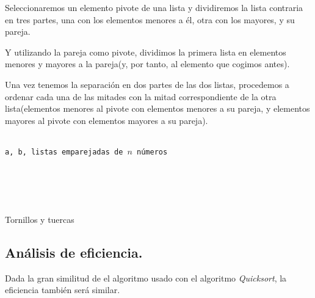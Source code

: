 \documentclass[a4paper, 11pt]{article} %
\begin{document}
    Seleccionaremos un elemento pivote de una lista y dividiremos la lista contraria en tres partes, una con los elementos menores a él, otra con los mayores, y su pareja.
    
    Y utilizando la pareja como pivote, dividimos la primera lista en elementos menores y mayores a la pareja(y, por tanto, al elemento que cogimos antes).
    
    Una vez tenemos la separación en dos partes de las dos listas, procedemos a ordenar cada una de las mitades con la mitad 
    correspondiente de la otra lista(elementos menores al pivote con elementos menores a su pareja, y elementos mayores al pivote con elementos mayores a su pareja).
\begin{algorithm}[H]
	\begin{algorithmic}[1]
	  \REQUIRE \ \\
	    \texttt{a, b, listas emparejadas de $n$ números}\\
	    \RETURN {\texttt{[]}}
	  \ELSE
	  \ENDIF \\
	  \ENDIF \\
	  
	  \ENDIF \\\
	\end{algorithmic}
    \caption{Tornillos y tuercas}
    \label{TyT}
\end{algorithm}
  \subsection{Análisis de eficiencia.}
      Dada la gran similitud de el algoritmo usado con el algoritmo \textit{Quicksort}, la eficiencia también será similar.
      
\end{document}
